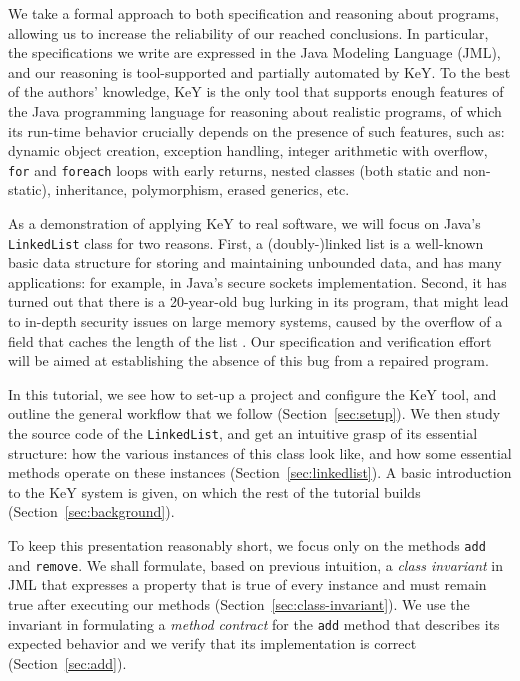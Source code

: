\documentclass[runningheads]{llncs}
\begin{document}
We take a formal approach to both specification and reasoning about programs, allowing us to increase the reliability of our reached conclusions. In particular, the specifications we write are expressed in the Java Modeling Language (JML), and our reasoning is tool-supported and partially automated by KeY. To the best of the authors' knowledge, KeY is the only tool that supports enough features of the Java programming language for reasoning about realistic programs, of which its run-time behavior crucially depends on the presence of such features, such as: dynamic object creation, exception handling, integer arithmetic with overflow, \texttt{for} and \texttt{foreach} loops with early returns, nested classes (both static and non-static), inheritance, polymorphism, erased generics, etc.

As a demonstration of applying KeY to real software, we will focus on Java's \texttt{LinkedList} class for two reasons. First, a (doubly-)linked list is a well-known basic data structure for storing and maintaining unbounded data, and has many applications: for example, in Java's secure sockets implementation. Second, it has turned out that there is a 20-year-old bug lurking in its program, that might lead to in-depth security issues on large memory systems, caused by the overflow of a field that caches the length of the list \cite{hiep2019verifying}. Our specification and verification effort will be aimed at establishing the absence of this bug from a repaired program.

In this tutorial, we see how to set-up a project and configure the KeY tool, and outline the general workflow that we follow (Section~\ref{sec:setup}). We then study the source code of the \texttt{LinkedList}, and get an intuitive grasp of its essential structure: how the various instances of this class look like, and how some essential methods operate on these instances (Section~\ref{sec:linkedlist}). A basic introduction to the KeY system is given, on which the rest of the tutorial builds (Section~\ref{sec:background}).

To keep this presentation reasonably short, we focus only on the methods \texttt{add} and \texttt{remove}. We shall formulate, based on previous intuition, a \emph{class invariant} in JML that expresses a property that is true of every instance and must remain true after executing our methods (Section~\ref{sec:class-invariant}). We use the invariant in formulating a \emph{method contract} for the \texttt{add} method that describes its expected behavior and we verify that its implementation is correct (Section~\ref{sec:add}).
\end{document}
